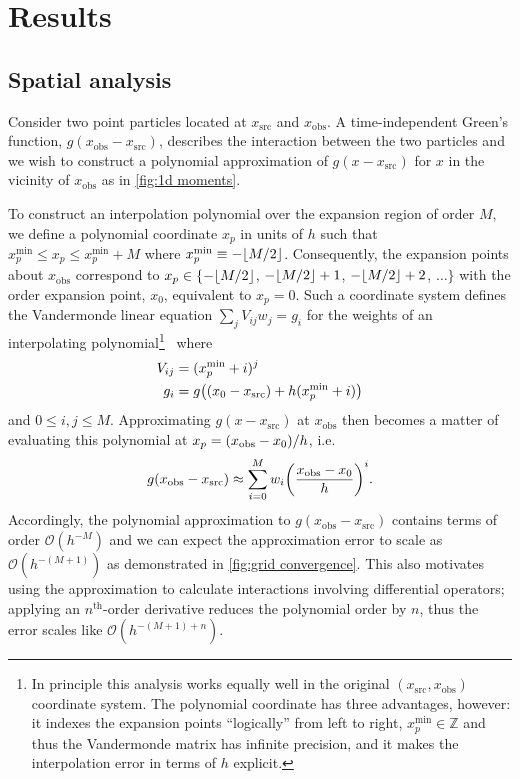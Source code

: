 \section{Results}

\subsection{Spatial analysis}

Consider two point particles located at $x_\text{src}$ and $x_\text{obs}$.
A time-independent Green's function, $g(x_\text{obs} - x_\text{src})$, describes the interaction between the two particles and we wish to construct a polynomial approximation of $g(x - x_\text{src})$ for $x$ in the vicinity of $x_\text{obs}$ as in \cref{fig:1d moments}.

To construct an interpolation polynomial over the expansion region of order $M$, we define a polynomial coordinate $x_p$ in units of $h$ such that $x_p^\text{min} \leqslant x_p \leqslant x_p^\text{min} + M$ where $x_p^\text{min} \equiv -\floor*{M/2}$.
Consequently, the expansion points about $x_\text{obs}$ correspond to $x_p \in \{-\floor*{M/2}$, $-\floor*{M/2} + 1$, $-\floor*{M/2} + 2$, $\ldots\}$ with the  order expansion point, $x_0$, equivalent to $x_p = 0$.
Such a coordinate system defines the Vandermonde linear equation $\sum_{j}V_{ij} w_j = g_i$ for the weights of an interpolating polynomial\footnote{In principle this analysis works equally well in the original $(x_\text{src}, x_\text{obs})$ coordinate system. The polynomial coordinate has three advantages, however: it indexes the expansion points ``logically'' from left to right, $x_p^\text{min} \in \mathbb{Z}$ and thus the Vandermonde matrix has infinite precision, and it makes the interpolation error in terms of $h$ explicit.}~\cite{NumericalRecipes} where
\begin{subequations}
  \begin{align}
    V_{ij} &= (x_p^\text{min} + i)^j \\
    g_i &= g\qty((x_0 - x_\text{src}) + h(x_p^\text{min} + i))
  \end{align}
\end{subequations}
and $0 \leqslant i, j \leqslant M$.
Approximating $g(x - x_\text{src})$ at $x_\text{obs}$ then becomes a matter of evaluating this polynomial at $x_p = \qty(x_\text{obs} - x_0)/h$, i.e.
\begin{equation}
  g(x_\text{obs} - x_\text{src}) \approx \sum_{i = 0}^{M} w_i \qty(\frac{x_\text{obs} - x_0}{h})^i.
\end{equation}
Accordingly, the polynomial approximation to $g(x_\text{obs} - x_\text{src})$ contains terms of order $\mathcal{O}(h^{-M})$ and we can expect the approximation error to scale as $\mathcal{O}(h^{-(M + 1)})$ as demonstrated in \cref{fig:grid convergence}.
This also motivates using the approximation to calculate interactions involving differential operators; applying an $n^\text{th}$-order derivative reduces the polynomial order by $n$, thus the error scales like $\mathcal{O}(h^{-(M + 1) + n})$.

